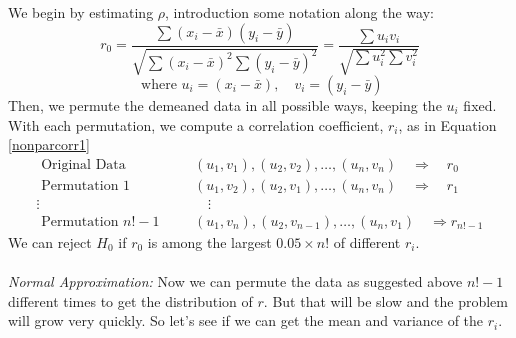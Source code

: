 \documentclass[a4paper,12pt]{scrartcl}
\begin{document}
We begin by estimating $\rho$, introduction some notation along the
way:
\begin{equation}
   \label{nonparcorr1}
   r_0 = \frac{\sum (x_i - \bar{x})(y_i - \bar{y})}{\sqrt{\sum 
   (x_i - \bar{x})^2 \sum (y_i - \bar{y})^2}} = 
   \frac{\sum u_i v_i}{\sqrt{\sum 
   u_i^2 \sum v_i^2}} 
\end{equation}
\[ \text{ where } u_i = (x_i - \bar{x}), \quad v_i = (y_i - \bar{y}) \]
Then, we permute the demeaned data in all possible ways, keeping the
$u_i$ fixed. With each permutation, we compute a correlation 
coefficient, $r_i$, as in Equation \ref{nonparcorr1}
\begin{align*}
   \text{ Original Data }  & \quad (u_1, v_1), (u_2, v_2), \ldots,
      (u_n, v_n) \quad \Rightarrow \quad r_0 \\
   \text{ Permutation 1 }  & \quad (u_1, v_2), (u_2, v_1), \ldots,
      (u_n, v_n) \quad \Rightarrow \quad r_1\\
   \vdots \qquad & \qquad \vdots\\
   \text{ Permutation $n!-1$ }  & \quad (u_1, v_n), (u_2, v_{n-1}), 
      \ldots, (u_n, v_1) \quad \Rightarrow r_{n!-1}
\end{align*}
We can reject $H_0$ if $r_0$ is among the largest $0.05 \times n!$ 
of different $r_i$.
\\
\\
{\sl Normal Approximation:} Now we can permute the data as suggested
above $n!-1$ different times to get the distribution of $r$. 
But that will be slow and the problem will grow very quickly. 
So let's see if we can get the mean and variance of the $r_i$.
\end{document}
